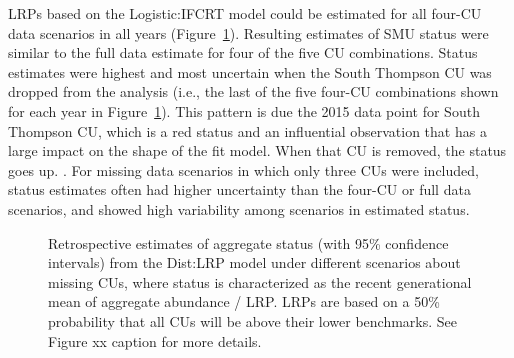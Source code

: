\documentclass[11pt]{book}
\begin{document}
LRPs based on the Logistic:IFCRT model could be estimated for all four-CU data scenarios in all years (Figure~\ref{fig:coho-distributional-missingCUs}). Resulting estimates of SMU status were similar to the full data estimate for four of the five CU combinations. Status estimates were highest and most uncertain when the South Thompson CU was dropped from the analysis (i.e., the last of the five four-CU combinations shown for each year in Figure~\ref{fig:coho-distributional-missingCUs}). This pattern is due the 2015 data point for South Thompson CU, which is a red status and an influential observation that has a large impact on the shape of the fit model. When that CU is removed, the status goes up. . For missing data scenarios in which only three CUs were included, status estimates often had higher uncertainty than the four-CU or full data scenarios, and showed high variability among scenarios in estimated status.
\begin{figure}[htb]

{\centering {} 

}

\caption{Retrospective estimates of aggregate status (with 95\% confidence intervals) from the Dist:LRP model under different scenarios about missing CUs, where status is characterized as the recent generational mean of aggregate abundance / LRP. LRPs are based on a 50\% probability that all CUs will be above their lower benchmarks. See Figure xx caption for more details.}\label{fig:coho-distributional-missingCUs}
\end{figure}
\linebreak
\end{document}
